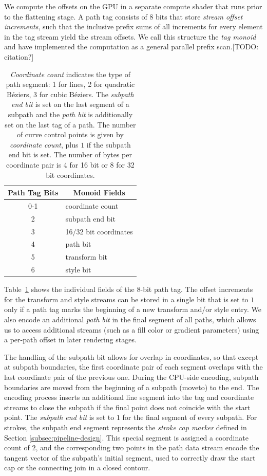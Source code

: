 \documentclass[sigconf, authordraft]{acmart}
\begin{document}
We compute the offsets on the GPU in a separate compute shader that runs prior to the flattening stage. A path tag consists of 8 bits that store \emph{stream offset increments}, such that the inclusive prefix sums of all increments for every element in the tag stream yield the stream offsets. We call this structure the \emph{tag monoid} and have implemented the computation as a general parallel prefix scan.[TODO: citation?]

\begin{table}
    \begin{tabular}{|c|l|}
    \hline
        \textbf{Path Tag Bits} & \multicolumn{1}{|c|}{\textbf{Monoid Fields}} \\
    \hline
        0-1 & coordinate count \\
        2 & subpath end bit \\
        3 & 16/32 bit coordinates \\
        4 & path bit \\
        5 & transform bit \\
        6 & style bit \\
    \hline
    \end{tabular}
    \caption{
        \emph{Coordinate count} indicates the type of path segment: 1 for lines, 2 for quadratic Béziers, 3 for cubic Béziers. The \emph{subpath end bit} is set on the last segment of a subpath and the \emph{path bit} is additionally set on the last tag of a path. The number of curve control points is given by \emph{coordinate count}, plus $1$ if the subpath end bit is set. The number of bytes per coordinate pair is 4 for 16 bit or 8 for 32 bit coordinates.
    }
    \label{table:pathtag}
\end{table}

Table~\ref{table:pathtag} shows the individual fields of the 8-bit path tag. The offset increments for the transform and style streams can be stored in a single bit that is set to $1$ only if a path tag marks the beginning of a new transform and/or style entry. We also encode an additional \emph{path bit} in the final segment of all paths, which allows us to access additional streams (such as a fill color or gradient parameters) using a per-path offset in later rendering stages.

The handling of the subpath bit allows for overlap in coordinates, so that except at subpath boundaries, the first coordinate pair of each segment overlaps with the last coordinate pair of the previous one. During the CPU-side encoding, subpath boundaries are moved from the beginning of a subpath (moveto) to the end. The encoding process inserts an additional line segment into the tag and coordinate streams to close the subpath if the final point does not coincide with the start point. The \emph{subpath end bit} is set to $1$ for the final segment of every subpath. For strokes, the subpath end segment represents the \emph{stroke cap marker} defined in Section \ref{subsec:pipeline-design}. This special segment is assigned a coordinate count of $2$, and the corresponding two points in the path data stream encode the tangent vector of the subpath's initial segment, used to correctly draw the start cap or the connecting join in a closed contour.
\end{document}
